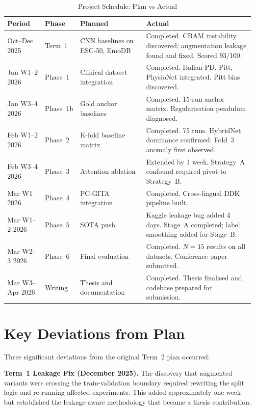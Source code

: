 \documentclass[oneside,openany]{final_report}
\begin{document}
\begin{table}[H]
\centering
\caption{Project Schedule: Plan vs Actual}
\label{tab:schedule}
\small
\begin{tabularx}{\textwidth}{l l X X}
\toprule
\textbf{Period} & \textbf{Phase} & \textbf{Planned} & \textbf{Actual} \\
\midrule
Oct--Dec 2025 & Term~1 & CNN baselines on ESC-50, EmoDB & Completed. CBAM instability discovered; augmentation leakage found and fixed. Scored 93/100. \\
Jan W1--2 2026 & Phase~1 & Clinical dataset integration & Completed. Italian PD, Pitt, PhysioNet integrated. Pitt bias discovered. \\
Jan W3--4 2026 & Phase~1b & Gold anchor baselines & Completed. 15-run anchor matrix. Regularisation pendulum diagnosed. \\
Feb W1--2 2026 & Phase~2 & K-fold baseline matrix & Completed. 75 runs. HybridNet dominance confirmed. Fold~3 anomaly first observed. \\
Feb W3--4 2026 & Phase~3 & Attention ablation & Extended by 1 week. Strategy~A confound required pivot to Strategy~B. \\
Mar W1 2026 & Phase~4 & PC-GITA integration & Completed. Cross-lingual DDK pipeline built. \\
Mar W1--2 2026 & Phase~5 & SOTA push & Kaggle leakage bug added 4 days. Stage~A completed; label smoothing added for Stage~B. \\
Mar W2--3 2026 & Phase~6 & Final evaluation & Completed. $N\!=\!15$ results on all datasets. Conference paper submitted. \\
Mar W3--Apr 2026 & Writing & Thesis and documentation & Completed. Thesis finalised and codebase prepared for submission. \\
\bottomrule
\end{tabularx}
\end{table}

\section{Key Deviations from Plan}

Three significant deviations from the original Term~2 plan occurred:

\textbf{Term~1 Leakage Fix (December 2025).} The discovery that augmented variants were crossing the train-validation boundary required rewriting the split logic and re-running affected experiments. This added approximately one week but established the leakage-aware methodology that became a thesis contribution.
\end{document}
